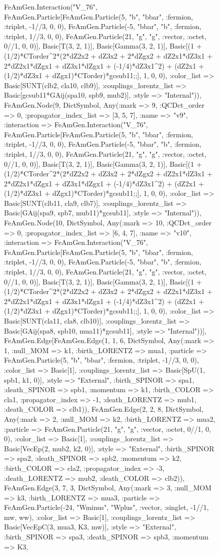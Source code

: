 \documentclass{revtex4}
\begin{document}
\begin{figure}[!htb]
\begin{center}
{FeAmGen.Interaction("V_76", FeAmGen.Particle[FeAmGen.Particle(5, "b", "bbar", :fermion, :triplet, -1//3, 0, 0), FeAmGen.Particle(-5, "bbar", "b", :fermion, :triplet, 1//3, 0, 0), FeAmGen.Particle(21, "g", "g", :vector, :octet, 0//1, 0, 0)], Basic[T(3, 2, 1)], Basic[Gamma(3, 2, 1)], Basic[(1 + (1/2)*CTorder^2*(2*dZ2x2 + dZ3x2 + 2*dZgx2 + dZ2x1*dZ3x1 + 2*dZ2x1*dZgx1 + dZ3x1*dZgx1 + (-1/4)*dZ3x1^2) + (dZ2x1 + (1/2)*dZ3x1 + dZgx1)*CTorder)*gcsub11;;], 1, 0, 0), :color_list => Basic[SUNT(clb2, cla10, clb9)], :couplings_lorentz_list => Basic[gcsub11*GAij(spa10, spb9, mub2)], :style => "Internal")), FeAmGen.Node(9, Dict{Symbol, Any}(:mark => 9, :QCDct_order => 0, :propagator_index_list => [3, 5, 7], :name => "v9", :interaction => FeAmGen.Interaction("V_76", FeAmGen.Particle[FeAmGen.Particle(5, "b", "bbar", :fermion, :triplet, -1//3, 0, 0), FeAmGen.Particle(-5, "bbar", "b", :fermion, :triplet, 1//3, 0, 0), FeAmGen.Particle(21, "g", "g", :vector, :octet, 0//1, 0, 0)], Basic[T(3, 2, 1)], Basic[Gamma(3, 2, 1)], Basic[(1 + (1/2)*CTorder^2*(2*dZ2x2 + dZ3x2 + 2*dZgx2 + dZ2x1*dZ3x1 + 2*dZ2x1*dZgx1 + dZ3x1*dZgx1 + (-1/4)*dZ3x1^2) + (dZ2x1 + (1/2)*dZ3x1 + dZgx1)*CTorder)*gcsub11;;], 1, 0, 0), :color_list => Basic[SUNT(clb11, cla9, clb7)], :couplings_lorentz_list => Basic[GAij(spa9, spb7, mub11)*gcsub11], :style => "Internal")), FeAmGen.Node(10, Dict{Symbol, Any}(:mark => 10, :QCDct_order => 0, :propagator_index_list => [6, 4, 7], :name => "v10", :interaction => FeAmGen.Interaction("V_76", FeAmGen.Particle[FeAmGen.Particle(5, "b", "bbar", :fermion, :triplet, -1//3, 0, 0), FeAmGen.Particle(-5, "bbar", "b", :fermion, :triplet, 1//3, 0, 0), FeAmGen.Particle(21, "g", "g", :vector, :octet, 0//1, 0, 0)], Basic[T(3, 2, 1)], Basic[Gamma(3, 2, 1)], Basic[(1 + (1/2)*CTorder^2*(2*dZ2x2 + dZ3x2 + 2*dZgx2 + dZ2x1*dZ3x1 + 2*dZ2x1*dZgx1 + dZ3x1*dZgx1 + (-1/4)*dZ3x1^2) + (dZ2x1 + (1/2)*dZ3x1 + dZgx1)*CTorder)*gcsub11;;], 1, 0, 0), :color_list => Basic[SUNT(cla11, cla8, clb10)], :couplings_lorentz_list => Basic[GAij(spa8, spb10, mua11)*gcsub11], :style => "Internal"))], FeAmGen.Edge[FeAmGen.Edge(1, 1, 6, Dict{Symbol, Any}(:mark => 1, :null_MOM => k1, :birth_LORENTZ => mua1, :particle => FeAmGen.Particle(5, "b", "bbar", :fermion, :triplet, -1//3, 0, 0), :color_list => Basic[1], :couplings_lorentz_list => Basic[SpU(1, spb1, k1, 0)], :style => "External", :birth_SPINOR => spa1, :death_SPINOR => spb1, :momentum => k1, :birth_COLOR => cla1, :propagator_index => -1, :death_LORENTZ => mub1, :death_COLOR => clb1)), FeAmGen.Edge(2, 2, 8, Dict{Symbol, Any}(:mark => 2, :null_MOM => k2, :birth_LORENTZ => mua2, :particle => FeAmGen.Particle(21, "g", "g", :vector, :octet, 0//1, 0, 0), :color_list => Basic[1], :couplings_lorentz_list => Basic[VecEp(2, mub2, k2, 0)], :style => "External", :birth_SPINOR => spa2, :death_SPINOR => spb2, :momentum => k2, :birth_COLOR => cla2, :propagator_index => -3, :death_LORENTZ => mub2, :death_COLOR => clb2)), FeAmGen.Edge(3, 7, 3, Dict{Symbol, Any}(:mark => 3, :null_MOM => k3, :birth_LORENTZ => mua3, :particle => FeAmGen.Particle(-24, "Wminus", "Wplus", :vector, :singlet, -1//1, mw, ww), :color_list => Basic[1], :couplings_lorentz_list => Basic[VecEpC(3, mua3, K3, mw)], :style => "External", :birth_SPINOR => spa3, :death_SPINOR => spb3, :momentum => K3, }
\end{center}
\end{figure}
\end{document}
